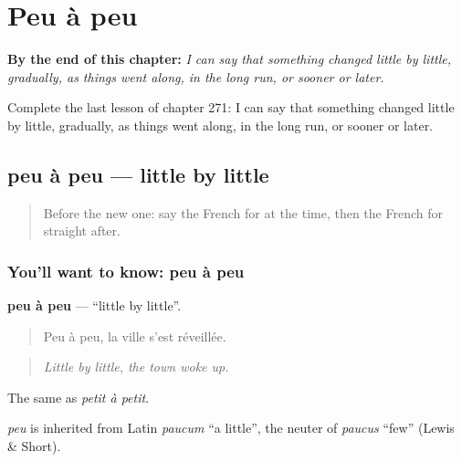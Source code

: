 
\chapter{Peu à peu}
\label{ch:fr-peu-a-peu}

\begin{chapteropening}
\textbf{By the end of this chapter:} \emph{I can say that something changed little by little, gradually, as things went along, in the long run, or sooner or later.}

Complete the last lesson of chapter 271: I can say that something changed little by little, gradually, as things went along, in the long run, or sooner or later.
\end{chapteropening}

\section[peu à peu]{peu à peu — little by little}

\label{lesson:FR-C271-peu-a-peu}



\begin{quote}
Before the new one: say the French for at the time, then the French for straight after.
\end{quote}

\subsection*{You'll want to know: peu à peu}
\textbf{peu à peu} — \textquotedblleft{}little by little\textquotedblright{}.

\begin{quote}
Peu à peu, la ville s'est réveillée.
\end{quote}

\begin{quote}
\emph{Little by little, the town woke up.}
\end{quote}

The same as \emph{petit à petit}.

\begin{cousinweb}
\emph{peu} is inherited from Latin \emph{paucum} \textquotedblleft{}a little\textquotedblright{}, the neuter of \emph{paucus} \textquotedblleft{}few\textquotedblright{} (Lewis \& Short).
\end{cousinweb}

